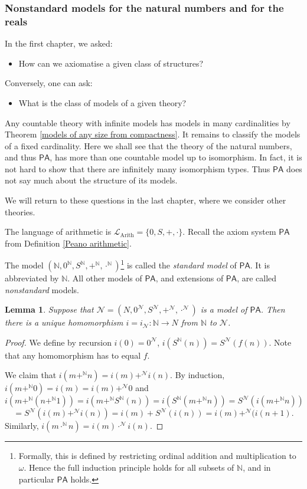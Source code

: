 \documentclass[a4paper, 11pt]{amsart}
\newtheorem{lemma}[lemma]{Lemma}
\theoremstyle{remark}
\newcommand{\axiomft}[1]{\mathsf{#1}}
\newcommand{\PA}{\axiomft{PA}}
\newcommand{\NN}{\mathbb{N}}
\newcommand{\cL}{\mathcal L}
\newcommand{\cN}{\mathcal N}
\begin{document}
\subsubsection{Nonstandard models for the natural numbers and for the reals} 

In the first chapter, we asked: 
\begin{itemize} 
\item 
How can we axiomatise a given class of structures? 
\end{itemize} 

Conversely, one can ask: 
\begin{itemize} 
\item 
What is the class of models of a given theory? 
\end{itemize} 

Any countable theory with infinite models has models in many cardinalities by Theorem \ref{models of any size from compactness}. 
It remains to classify the models of a fixed cardinality. 
Here we shall see that the theory of the natural numbers, and thus $\PA$, has more than one countable model up to isomorphism. 
In fact, it is not hard to show that there are infinitely many isomorphism types. 
Thus $\PA$ does not say much about the structure of its models. 

We will return to these questions in the last chapter, where we consider other theories. 

The language of arithmetic is $\cL_{\mathrm{Arith}}=\{0, S, +, \cdot\}$. 
Recall the axiom system $\PA$ from Definition \ref{Peano arithmetic}. 

The model $(\NN,0^\NN,S^\NN,+^\NN,\cdot^\NN)$\footnote{Formally, this is defined by restricting ordinal addition and multiplication to $\omega$. Hence the full induction principle holds for all subsets of $\NN$, and in particular $\PA$ holds.}  is called the \emph{standard model} of $\PA$. 
It is abbreviated by $\NN$. 
All other models of $\PA$, and extensions of $\PA$,  are called \emph{nonstandard} models.  


\begin{lemma} 
Suppose that $\cN=(N,0^\cN,S^\cN,+^\cN,\cdot^\cN)$ is a model of $\PA$. 
Then there is a unique homomorphism $i=i_\cN\colon \NN\rightarrow N$ from $\NN$ to $\cN$. 
\end{lemma} 
\begin{proof} 
We define by recursion $i(0)=0^\cN$, $i(S^\NN(n))=S^\cN(f(n))$. 
Note that any homomorphism has to equal $f$. 

We claim that 
$i(m+^\NN n)=i(m)+^\cN i(n)$. 
By induction, 
$i(m+^\NN0)=i(m)=i(m)+^\cN0$ and 
$$i(m+^\NN (n+^\NN1)) = i(m +^\NN S^\NN(n)) = i(S^\NN(m+^\NN n)) = S^\cN(i(m+^\NN n))$$  
$$ = S^\cN(i(m)+^\cN i(n)) = i(m) + S^\cN(i(n))  = i(m) +^\cN (i(n+1).$$ 
Similarly, $i(m\cdot^\NN n)=i(m)\cdot^\cN i(n)$. 
\end{proof} 
\end{document}
